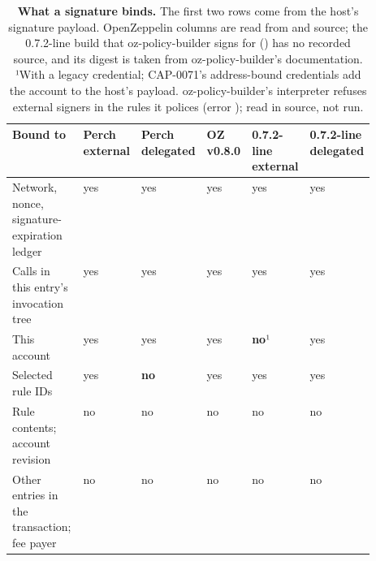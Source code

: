 \begin{table}[tbp]
\centering
\caption{\textbf{What a signature binds.} The first two rows come from the host's signature payload. OpenZeppelin columns are read from   and  source; the 0.7.2-line build that oz-policy-builder signs for () has no recorded source, and its digest is taken from oz-policy-builder's documentation. ¹With a legacy  credential; CAP-0071's address-bound credentials add the account to the host's payload. oz-policy-builder's interpreter refuses external signers in the rules it polices (error ); read in source, not run.}\label{tab:tab-binding}
\scriptsize\begin{tabularx}{\linewidth}{@{}L*{5}{>{\centering\arraybackslash}p{0.105\linewidth}}@{}}
\toprule
\textbf{Bound to} & \textbf{Perch external} & \textbf{Perch delegated} & \textbf{OZ v0.8.0} & \textbf{0.7.2-line external} & \textbf{0.7.2-line delegated} \\
\midrule
Network, nonce, signature-expiration ledger & yes & yes & yes & yes & yes \\
Calls in this entry's invocation tree & yes & yes & yes & yes & yes \\
This account & yes & yes & yes & \textbf{no}¹ & yes \\
Selected rule IDs & yes & \textbf{no} & yes & yes & yes \\
Rule contents; account revision & no & no & no & no & no \\
Other entries in the transaction; fee payer & no & no & no & no & no \\
\bottomrule
\end{tabularx}
\end{table}
